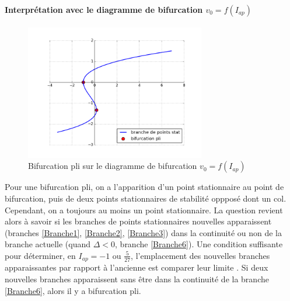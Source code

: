 \documentclass[12pt,a4paper,onecolumn]{article}
\begin{document}
\paragraph{Interprétation avec le diagramme de bifurcation \texorpdfstring{$v_0=f(I_{ap})$}{Lg}}
\begin{figure}[H]
\begin{center}
\includegraphics[origin =c, width = 0.7\textwidth]{bifpli.png}
\end{center}
\caption{Bifurcation pli sur le diagramme de bifurcation $v_0=f(I_{ap})$}
\end{figure}
Pour une bifurcation pli, on a l'apparition d'un point stationnaire au point de bifurcation, puis de deux points stationnaires de stabilité oppposé dont un col. Cependant, on a toujours au moins un point stationnaire. La question revient alors à savoir si les branches de points stationnaires nouvelles apparaissent (branches \ref{Branche1}, \ref{Branche2}, \ref{Branche3}) dans la continuité ou non de la branche actuelle (quand $\Delta < 0$, branche \ref{Branche6}). Une condition suffisante pour déterminer, en $I_{ap} = -1$ ou $\frac{5}{27}$, l'emplacement des nouvelles branches apparaissantes par rapport à l'ancienne est comparer leur limite . Si deux nouvelles branches apparaissent sans être dans la continuité de la branche \ref{Branche6}, alors il y a bifurcation pli.

\end{document}
